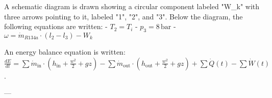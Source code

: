 A schematic diagram is drawn showing a circular component labeled "W_k" with three arrows pointing to it, labeled "1", "2", and "3". Below the diagram, the following equations are written:  
- \( T_2 = T_i \)  
- \( p_3 = 8 \, \text{bar} \)  
- \( \omega = \dot{m}_{R134a} \cdot (l_2 - l_3) - W_k \)  

An energy balance equation is written:  
\( \frac{dE}{dt} = \sum \dot{m}_{\text{in}} \cdot (h_{\text{in}} + \frac{w^2}{2} + gz) - \sum \dot{m}_{\text{out}} \cdot (h_{\text{out}} + \frac{w^2}{2} + gz) + \sum \dot{Q}(t) - \sum \dot{W}(t) \).  

---